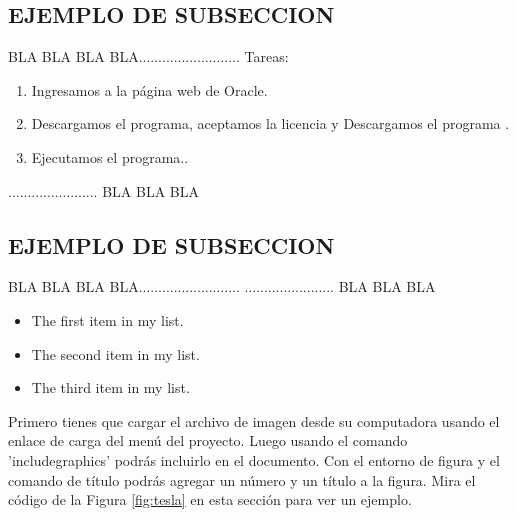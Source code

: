 \documentclass[12pt,a4paper]{report}
\begin{document}
\subsection{EJEMPLO DE SUBSECCION}
BLA BLA BLA BLA..........................
Tareas:
\begin{enumerate}
    \item Ingresamos a la página web de Oracle.
    \item Descargamos el programa, aceptamos la licencia y Descargamos el programa .
    \item Ejecutamos el programa..
\end{enumerate}
....................... BLA BLA BLA
\subsection{EJEMPLO DE SUBSECCION}
BLA BLA BLA BLA..........................
....................... BLA BLA BLA
\begin{itemize}
\item The first item in my list. 
\item The second item in my list.
\item The third item in my list.
\end{itemize}
Primero tienes que cargar el archivo de imagen desde su computadora usando el enlace de carga del menú del proyecto. Luego usando el comando 'includegraphics' podrás incluirlo en el documento. Con el entorno de figura y el comando de título podrás agregar un número y un título a la figura. Mira el código de la Figura \ref{fig:tesla} en esta sección para ver un ejemplo.
\end{document}
